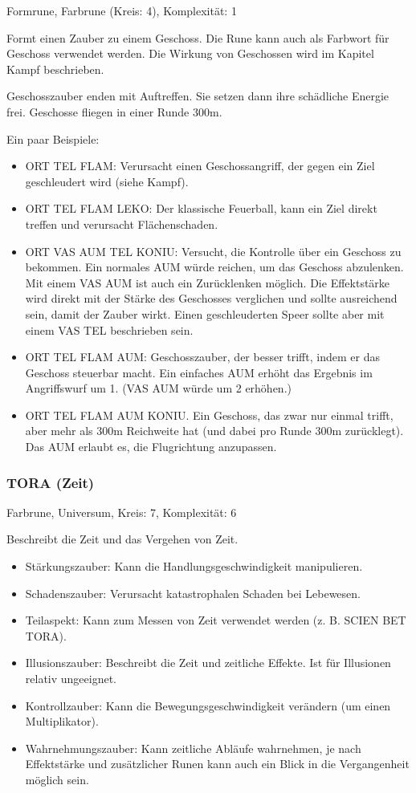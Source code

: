 \documentclass{article}
\begin{document}
Formrune, Farbrune (Kreis: 4), Komplexität: 1

Formt einen Zauber zu einem Geschoss. Die Rune kann auch als Farbwort für Geschoss verwendet werden. Die Wirkung von
Geschossen wird im Kapitel Kampf beschrieben.

Geschosszauber enden mit Auftreffen. Sie setzen dann ihre schädliche Energie frei. Geschosse fliegen in einer Runde 300m.

Ein paar Beispiele:

\begin{itemize}
\item ORT TEL FLAM: Verursacht einen Geschossangriff, der gegen ein Ziel geschleudert wird (siehe Kampf).
\item ORT TEL FLAM LEKO: Der klassische Feuerball, kann ein Ziel direkt treffen und verursacht Flächenschaden.
\item ORT VAS AUM TEL KONIU: Versucht, die Kontrolle über ein Geschoss zu bekommen. Ein normales AUM würde reichen, um das Geschoss abzulenken. Mit einem VAS AUM ist auch ein Zurücklenken möglich. Die Effektstärke wird direkt mit der Stärke des Geschosses verglichen und sollte ausreichend sein, damit der Zauber wirkt. Einen geschleuderten Speer sollte aber mit einem VAS TEL beschrieben sein.
\item ORT TEL FLAM AUM: Geschosszauber, der besser trifft, indem er das Geschoss steuerbar macht. Ein einfaches AUM erhöht das Ergebnis im Angriffswurf um 1. (VAS AUM würde um 2 erhöhen.)
\item ORT TEL FLAM AUM KONIU. Ein Geschoss, das zwar nur einmal trifft, aber mehr als 300m Reichweite hat (und dabei pro Runde 300m zurücklegt). Das AUM erlaubt es, die Flugrichtung anzupassen.
\end{itemize}

\subsubsection{TORA (Zeit)}

Farbrune, Universum, Kreis: 7, Komplexität: 6

Beschreibt die Zeit und das Vergehen von Zeit.

\begin{itemize}
\item Stärkungszauber: Kann die Handlungsgeschwindigkeit manipulieren.
\item Schadenszauber: Verursacht katastrophalen Schaden bei Lebewesen.
\item Teilaspekt: Kann zum Messen von Zeit verwendet werden (z. B. SCIEN BET TORA).
\item Illusionszauber: Beschreibt die Zeit und zeitliche Effekte. Ist für Illusionen relativ ungeeignet.
\item Kontrollzauber: Kann die Bewegungsgeschwindigkeit verändern (um einen Multiplikator).
\item Wahrnehmungszauber: Kann zeitliche Abläufe wahrnehmen, je nach Effektstärke und zusätzlicher Runen kann auch ein Blick in die Vergangenheit möglich sein.
\end{itemize}
\end{document}
